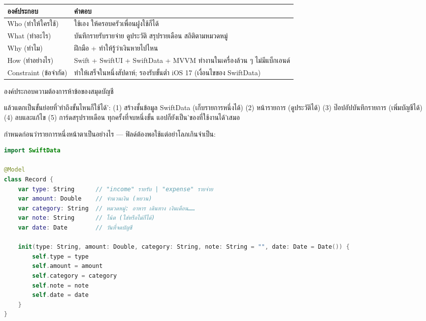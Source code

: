 


\begin{center}
\begin{tabularx}{\linewidth}{|X|X|}
\hline
\textbf{องค์ประกอบ} & \textbf{คำตอบ} \tabularnewline
\hline
Who (ทำให้ใครใช้) & ใช้เอง ให้ครอบครัวเพื่อนฝูงใช้ก็ได้ \tabularnewline
What (ทำอะไร) & บันทึกรายรับรายจ่าย ดูประวัติ สรุปรายเดือน สถิติตามหมวดหมู่ \tabularnewline
Why (ทำไม) & ฝึกมือ + ทำให้รู้ว่าเงินหายไปไหน \tabularnewline
How (ทำอย่างไร) & Swift + SwiftUI + SwiftData + MVVM ทำงานในเครื่องล้วน ๆ ไม่มีแบ็กเอนด์ \tabularnewline
Constraint (ข้อจำกัด) & ทำให้เสร็จในหนึ่งสัปดาห์; รองรับขั้นต่ำ iOS 17 (เงื่อนไขของ SwiftData) \tabularnewline
\hline
\end{tabularx}
\end{center}

\begin{center}\small\color{gray}องค์ประกอบความต้องการห้าข้อของสมุดบัญชี\end{center}

แล้วแตกเป็นขั้นย่อยที่'ทำถึงขั้นไหนก็ใช้ได้': (1) สร้างชั้นข้อมูล SwiftData (เก็บรายการหนึ่งได้) (2) หน้ารายการ (ดูประวัติได้) (3) ป๊อปอัปบันทึกรายการ (เพิ่มบัญชีได้) (4) ลบและแก้ไข (5) การ์ดสรุปรายเดือน ทุกครั้งที่จบหนึ่งขั้น แอปก็ยังเป็น'ของที่ใช้งานได้'เสมอ


กำหนดก่อนว่ารายการหนึ่งหน้าตาเป็นอย่างไร — ฟิลด์ต้องพอใช้แต่อย่าโลภเกินจำเป็น:

\begin{lstlisting}[language=Swift]
import SwiftData

@Model
class Record {
    var type: String      // "income" รายรับ | "expense" รายจ่าย
    var amount: Double    // จำนวนเงิน (หยวน)
    var category: String  // หมวดหมู่: อาหาร เดินทาง เงินเดือน……
    var note: String      // โน้ต (ใส่หรือไม่ก็ได้)
    var date: Date        // วันที่จดบัญชี

    init(type: String, amount: Double, category: String, note: String = "", date: Date = Date()) {
        self.type = type
        self.amount = amount
        self.category = category
        self.note = note
        self.date = date
    }
}
\end{lstlisting}

